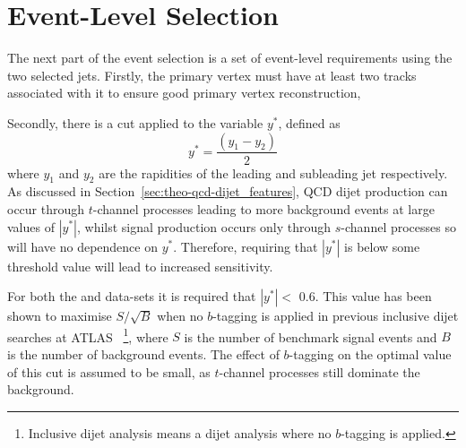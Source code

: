 
\section{Event-Level Selection}
\label{sec:evt-sel-event}

The next part of the event selection is a set of event-level requirements using the two selected jets.
Firstly, the primary vertex must have at least two  tracks associated with it
to ensure good primary vertex reconstruction,

\noindent
Secondly, there is a cut applied to the variable $y^*$, defined as
\begin{equation}
  y^* = \frac{(y_1-y_2)}{2}
\end{equation}
where $y_1$ and $y_2$ are the rapidities of the leading and subleading jet respectively.
As discussed in Section~\ref{sec:theo-qcd-dijet_features}, QCD dijet production can occur through $t$-channel processes leading to more background events at large values of $|y^*|$,
whilst signal production occurs only through $s$-channel processes so will have no dependence on $y^*$.
Therefore, requiring that $|y^*|$ is below some threshold value will lead to increased sensitivity.

For both the \summer{} and \lm{} data-sets it is required that $|y^*| <$ 0.6.
This value has been shown to maximise $S/\sqrt{B}$ when no $b$-tagging is applied
in previous inclusive dijet searches at ATLAS~\cite{dijet-mori16_paper}
\footnote{Inclusive dijet analysis means a dijet analysis where no $b$-tagging is applied.},
where $S$ is the number of benchmark signal events and $B$ is the number of background events.
The effect of $b$-tagging on the optimal value of this cut is assumed to be small,
as $t$-channel processes still dominate the background.

